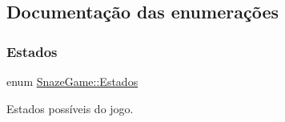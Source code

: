 \subsection{Documentação das enumerações}
\mbox{\label{classSnazeGame_a10ea6cb420042fdbfcade4f0261af5c1}} 
\subsubsection{\texorpdfstring{Estados}{Estados}}
{\footnotesize\ttfamily enum \hyperlink{classSnazeGame_a10ea6cb420042fdbfcade4f0261af5c1}{Snaze\+Game\+::\+Estados}}



Estados possíveis do jogo. 

